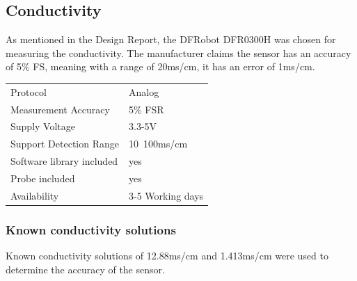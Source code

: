 \subsection{Conductivity}
As mentioned in the Design Report, the DFRobot DFR0300H \cite{DFR0300H} was chosen for measuring the conductivity. The manufacturer claims the sensor has an accuracy of 5\% FS, meaning with a range of 20ms/cm, it has an error of 1ms/cm. 

\begin{table}[h!]
	\centering
	\quad
	\begin{tabular}{| l | l |}
    \hline
    Protocol & Analog\\
    Measurement Accuracy &  5\% FSR\\
    Supply Voltage & 3.3-5V\\
    Support Detection Range & 10~100ms/cm\\
    Software library included & yes \\
    Probe included & yes \\
    Availability & 3-5 Working days \\
    \hline
	\end{tabular}
\end{table}

\subsubsection{Known conductivity solutions}
Known conductivity solutions of 12.88ms/cm and 1.413ms/cm were used to determine the accuracy of the sensor.

